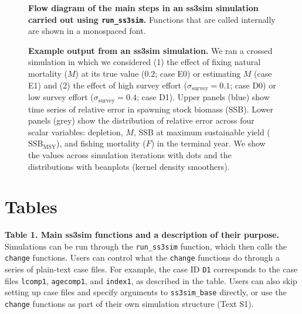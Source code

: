 \documentclass[10pt]{article}
\begin{document}
\begin{thebibliography}{10}
\begin{figure}[!ht]
\begin{center}
\end{center}
\caption{
{\bf Flow diagram of the main steps
in an ss3sim simulation carried out using \texttt{run\_ss3sim}.}
Functions that are called internally are shown in a monospaced font.
}
\label{fig:sim-steps}
\end{figure}

\begin{figure}[!ht]
\begin{center}
\end{center}
\caption{
{\bf Example output from an ss3sim simulation.}
We ran a crossed simulation in which we considered
(1) the effect of fixing natural mortality ($M$)
at its true value (0.2; case E0) or estimating $M$ (case E1) and
(2) the effect of high survey effort
($\sigma_\mathrm{survey} = 0.1$; case D0)
or low survey effort ($\sigma_\mathrm{survey} = 0.4$; case D1).
Upper panels (blue) show time series of relative error
in spawning stock biomass (SSB).
Lower panels (grey) show the distribution
of relative error across four scalar variables:
depletion, $M$, SSB at maximum sustainable yield ($\mathrm{SSB}_\mathrm{MSY}$),
and fishing mortality ($F$) in the terminal year.
We show the values across simulation iterations with dots
and the distributions with beanplots (kernel density smoothers).
}
\label{fig:results}
\end{figure}

\clearpage

\section*{Tables}

\textbf{Table 1. Main ss3sim functions and a description of their purpose.} Simulations can be run through the \texttt{run\_ss3sim} function, which then calls the \texttt{change} functions. Users can control what the \texttt{change} functions do through a series of plain-text case files. For example, the case ID \texttt{D1} corresponds to the case files \texttt{lcomp1}, \texttt{agecomp1}, and \texttt{index1}, as described in the table. Users can also skip setting up case files and specify arguments to \texttt{ss3sim\_base} directly, or use the \texttt{change} functions as part of their own simulation structure (Text S1).


\end{thebibliography}
\end{document}
